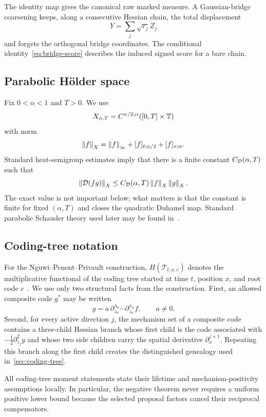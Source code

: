 The identity map gives the canonical raw marked measure. A Gaussian-bridge coarsening keeps, along a consecutive Hessian chain, the total displacement
\begin{equation*}
  Y=\sum_j\sqrt{r_j}Z_j
\end{equation*}
and forgets the orthogonal bridge coordinates. The conditional identity~\eqref{eq:bridge-score} describes the induced signed score for a bare chain.

\subsection{Parabolic H\"older space}

Fix $0<\alpha<1$ and $T>0$. We use
\begin{equation*}
  X_{\alpha,T}
  =
  C^{\alpha/2,\alpha}([0,T]\times\mathbb T)
\end{equation*}
with norm
\begin{equation}
  \left\lVert f\right\rVert_X
  =
  \left\lVert f\right\rVert_\infty
  +[f]_{t;\alpha/2}
  +[f]_{x;\alpha}.
  \label{eq:X-norm}
\end{equation}
Standard heat-semigroup estimates imply that there is a finite constant $C_{\mathcal D}(\alpha,T)$ such that
\begin{equation}
  \left\lVert\mathcal D(fg)\right\rVert_X
  \leq
  C_{\mathcal D}(\alpha,T)\left\lVert f\right\rVert_X\left\lVert g\right\rVert_X.
  \label{eq:D-bilinear-bound}
\end{equation}
The exact value is not important below; what matters is that the constant is finite for fixed $(\alpha,T)$ and closes the quadratic Duhamel map. Standard parabolic Schauder theory used later may be found in~\cite{Evans2010,Friedman1964,Lieberman1996}.

\subsection{Coding-tree notation}

For the Nguwi--Penent--Privault construction, $H(\mathcal T_{t,x,c})$ denotes the multiplicative functional of the coding tree started at time $t$, position $x$, and root code $c$~\cite{NguwiPenentPrivault2023}. We use only two structural facts from the construction. First, an allowed composite code $g^*$ may be written
\begin{equation*}
  g
  =
  a\,\partial_{z_0}^{\lambda_0}\cdots
  \partial_{z_n}^{\lambda_n}f,
  \qquad a\neq0.
\end{equation*}
Second, for every active direction $j$, the mechanism set of a composite code contains a three-child Hessian branch whose first child is the code associated with $-\frac12\partial_{z_j}^2g$ and whose two side children carry the spatial derivative $\partial_x^{j+1}$. Repeating this branch along the first child creates the distinguished genealogy used in~\cref{sec:coding-tree}.

All coding-tree moment statements state their lifetime and mechanism-positivity assumptions locally. In particular, the negative theorem never requires a uniform positive lower bound because the selected proposal factors cancel their reciprocal compensators.
